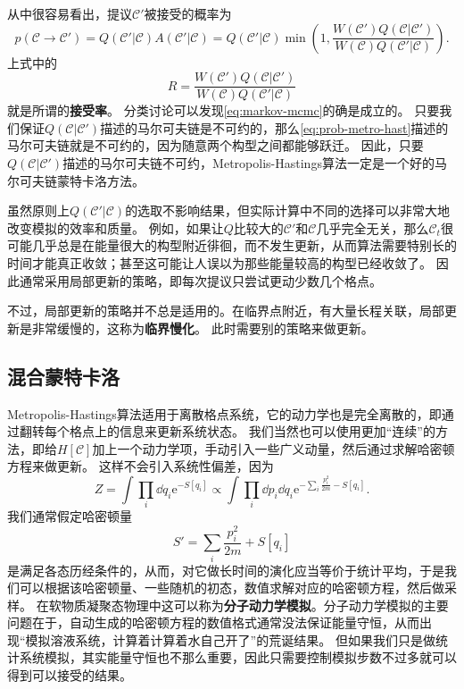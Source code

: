 \documentclass[hyperref, UTF8, a4paper]{ctexart}
\newcommand*{\ee}{\mathrm{e}}
\renewcommand{\autoref}{\prettyref}
\newcommand*{\concept}[1]{{\textbf{#1}}}
\begin{document}
从\autoref{alg:metro-hast}中很容易看出，提议$\mathcal{C}'$被接受的概率为
\begin{equation}
    p(\mathcal{C} \to \mathcal{C}') = Q(\mathcal{C}' | \mathcal{C}) A(\mathcal{C}' | \mathcal{C}) = Q(\mathcal{C}' | \mathcal{C}) \min \left(1, \frac{W(\mathcal{C}') Q(\mathcal{C} | \mathcal{C}')}{W(\mathcal{C}) Q(\mathcal{C}' | \mathcal{C})} \right).
    \label{eq:prob-metro-hast}
\end{equation}
上式中的
\begin{equation}
    R = \frac{W(\mathcal{C}') Q(\mathcal{C} | \mathcal{C}')}{W(\mathcal{C}) Q(\mathcal{C}' | \mathcal{C})}
\end{equation}
就是所谓的\concept{接受率}。
分类讨论可以发现\eqref{eq:markov-mcmc}的确是成立的。
只要我们保证$Q(\mathcal{C} | \mathcal{C}')$描述的马尔可夫链是不可约的，那么\eqref{eq:prob-metro-hast}描述的马尔可夫链就是不可约的，因为随意两个构型之间都能够跃迁。
因此，只要$Q(\mathcal{C} | \mathcal{C}')$描述的马尔可夫链不可约，Metropolis-Hastings算法一定是一个好的马尔可夫链蒙特卡洛方法。

虽然原则上$Q(\mathcal{C}' | \mathcal{C})$的选取不影响结果，但实际计算中不同的选择可以非常大地改变模拟的效率和质量。
例如，如果让$Q$比较大的$\mathcal{C}'$和$\mathcal{C}$几乎完全无关，那么$\mathcal{C}_t$很可能几乎总是在能量很大的构型附近徘徊，而不发生更新，从而算法需要特别长的时间才能真正收敛；甚至这可能让人误以为那些能量较高的构型已经收敛了。
因此通常采用局部更新的策略，即每次提议只尝试更动少数几个格点。

不过，局部更新的策略并不总是适用的。在临界点附近，有大量长程关联，局部更新是非常缓慢的，这称为\concept{临界慢化}。
此时需要别的策略来做更新。

\subsection{混合蒙特卡洛}

Metropolis-Hastings算法适用于离散格点系统，它的动力学也是完全离散的，即通过翻转每个格点上的信息来更新系统状态。
我们当然也可以使用更加“连续”的方法，即给$H[\mathcal{C}]$加上一个动力学项，手动引入一些广义动量，然后通过求解哈密顿方程来做更新。
这样不会引入系统性偏差，因为
\begin{equation}
    Z = \int \prod_i \dd{q_i} \ee^{- S[q_i]} \propto \int \prod_i \dd{p}_i \dd{q}_i \ee^{-\sum_i \frac{p_i^2}{2m} - S[q_i]}.
    \label{eq:molecular-dynamics}
\end{equation}
我们通常假定哈密顿量
\[
    S' = \sum_i \frac{p_i^2}{2m} + S[q_i]
\]
是满足各态历经条件的，从而，对它做长时间的演化应当等价于统计平均，于是我们可以根据该哈密顿量、一些随机的初态，数值求解对应的哈密顿方程，然后做采样。
在软物质凝聚态物理中这可以称为\concept{分子动力学模拟}。分子动力学模拟的主要问题在于，自动生成的哈密顿方程的数值格式通常没法保证能量守恒，从而出现“模拟溶液系统，计算着计算着水自己开了”的荒诞结果。
但如果我们只是做统计系统模拟，其实能量守恒也不那么重要，因此只需要控制模拟步数不过多就可以得到可以接受的结果。
\end{document}
